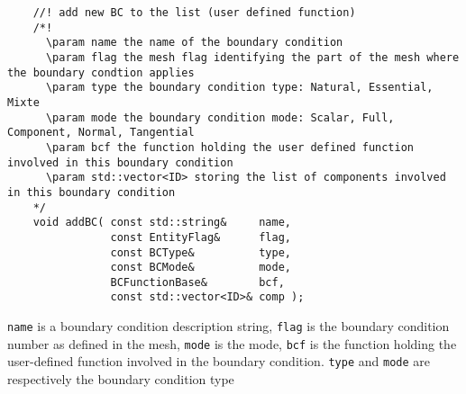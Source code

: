 \begin{verbatim}
    //! add new BC to the list (user defined function)
    /*!
      \param name the name of the boundary condition
      \param flag the mesh flag identifying the part of the mesh where the boundary condtion applies
      \param type the boundary condition type: Natural, Essential, Mixte
      \param mode the boundary condition mode: Scalar, Full, Component, Normal, Tangential
      \param bcf the function holding the user defined function involved in this boundary condition
      \param std::vector<ID> storing the list of components involved in this boundary condition
    */
    void addBC( const std::string&     name,
                const EntityFlag&      flag,
                const BCType&          type,
                const BCMode&          mode,
                BCFunctionBase&        bcf,
                const std::vector<ID>& comp );
\end{verbatim}
\verb!name! is a boundary condition description string,
\verb!flag! is the boundary condition number as defined in the mesh,
\verb!mode! is the mode, \verb!bcf! is the function holding the user-defined function involved
in the boundary condition. \verb!type! and \verb!mode! are respectively the boundary condition type
